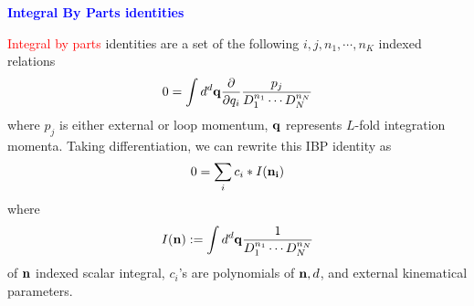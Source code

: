 \documentclass[10pt]{article}
\begin{document}
\textbf{\textcolor{blue}{Integral By Parts identities}}

\textcolor{red}{Integral by parts} identities are a set of the following $i,j, n_1,\cdots, n_K$ indexed relations
\begin{eqnarray}
\nonumber
0 = \int d^d \bold{q} \frac{\partial }{\partial q_i} \frac{p_j}{D_1^{n_1} \cdots D_N^{n_N}} 
\end{eqnarray}
where $p_j$ is either external or loop momentum, $\bold{q}$ represents $L$-fold integration momenta.
Taking differentiation, we can rewrite this IBP identity as
\begin{eqnarray}
\nonumber
0 = \sum_i c_i * I(\bold{n_i})
\end{eqnarray}
where
\begin{eqnarray}
\nonumber
I(\bold{n}) := \int d^d \bold{q}\frac{1}{D_1^{n_1} \cdots D_N^{n_N}} 
\end{eqnarray}
of $\bold{n}$ indexed scalar integral, $c_i$'s are polynomials of $\bold{n}, d$, and external kinematical parameters.
\end{document}
